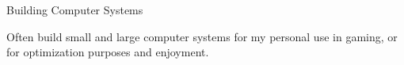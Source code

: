 \begin{cventries}
  \cventry
    {}
    {Building Computer Systems}
    {}
    {}
    {
    \vspace{-25pt}
      \begin{cvitems}
        \item {Often build small and large computer systems for my personal use in gaming, or for optimization purposes and enjoyment.}
      \end{cvitems}
    }
\end{cventries}
\vspace{-5pt}